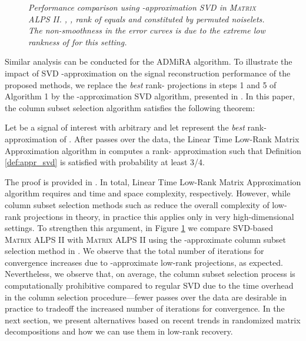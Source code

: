 \documentclass[twocolumn]{svjour3}
\begin{document}
\begin{figure}[!ht]
\centering
{}
\caption{\small\sl Performance comparison using -approximation SVD \cite{deshpande2} in \textsc{Matrix ALPS II}. , , rank of  equals  and  constituted by permuted noiselets. The non-smoothness in the error curves is due to the extreme low rankness of  for this setting. } \label{fig: lambda1}
\end{figure}

Similar analysis can be conducted for the ADMiRA algorithm. To illustrate the impact of SVD -approximation on the signal reconstruction performance of the proposed methods, we replace the {\it best} rank- projections in steps 1 and 5 of Algorithm 1 by the -approximation SVD algorithm, presented in \cite{deshpande2}. In this paper, the column subset selection algorithm satisfies the following theorem:

\begin{theorem}{\label{thm:adaptiveVolume}} 
Let  be a signal of interest with arbitrary  and let  represent the {\it best} rank- approximation of . After  passes over the data, the Linear Time Low-Rank Matrix Approximation algorithm in \cite{deshpande2} computes a rank- approximation  such that Definition \ref{def:appr_svd} is satisfied with probability at least 3/4.
\end{theorem} 

The proof is provided in \cite{deshpande2}. In total, Linear Time Low-Rank Matrix Approximation algorithm \cite{deshpande2} requires    and  time and space complexity, respectively. However, while column subset selection methods such as \cite{deshpande2} reduce the overall complexity of low-rank projections in theory, in practice this applies only in very high-dimensional settings. To strengthen this argument, in Figure \ref{fig: lambda1} we compare SVD-based \textsc{Matrix ALPS II}	with \textsc{Matrix ALPS II} using the -approximate column subset selection method in \cite{deshpande2}. We observe that the total number of iterations for convergence increases due to -approximate low-rank projections, as expected. Nevertheless, we observe that, on average, the column subset selection process \cite{deshpande2} is computationally prohibitive compared to regular SVD due to the time overhead in the column selection procedure---fewer passes over the data are desirable in practice to tradeoff the increased number of iterations for convergence. In the next section, we present alternatives based on recent trends in randomized matrix decompositions and how we can use them in low-rank recovery.
\end{document}
